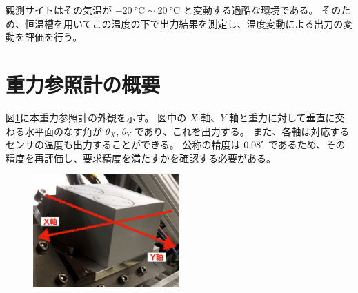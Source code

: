 \documentclass[../../main.tex]{subfiles}
\begin{document}
観測サイトはその気温が $\SI{-20}{\degreeCelsius} \sim \SI{20}{\degreeCelsius}$ と変動する過酷な環境である。
そのため、恒温槽を用いてこの温度の下で出力結果を測定し、温度変動による出力の変動を評価を行う。

\section{重力参照計の概要}
図\ref{fig:tiltsensor_DSIC-2051-60}に本重力参照計の外観を示す。
図中の $X$ 軸、$Y$ 軸と重力に対して垂直に交わる水平面のなす角が $\theta_{X},\,\theta_{Y}$ であり、これを出力する。
また、各軸は対応するセンサの温度も出力することができる。
公称の精度は $0.08\tcdegree$ であるため、その精度を再評価し、要求精度を満たすかを確認する必要がある。
\begin{figure}[H]
    \centering
    \includegraphics[width=0.5\textwidth]{tiltsensor/tiltsensor_overview.pdf}
    \label{fig:tiltsensor_DSIC-2051-60}
\end{figure}

\end{document}
